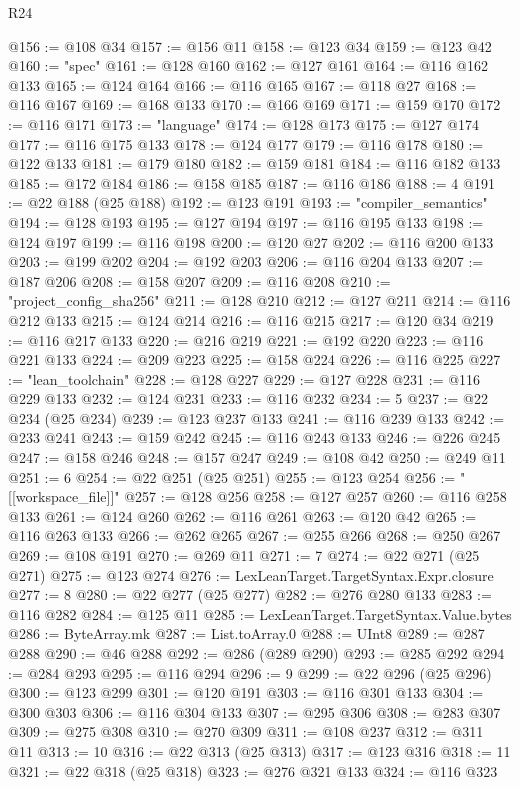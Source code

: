\begin{lexlean}{R24}
\begin{coremodule}
@156 := @108 @34
@157 := @156 @11
@158 := @123 @34
@159 := @123 @42
@160 := "spec"
@161 := @128 @160
@162 := @127 @161
@164 := @116 @162 @133
@165 := @124 @164
@166 := @116 @165
@167 := @118 @27
@168 := @116 @167
@169 := @168 @133
@170 := @166 @169
@171 := @159 @170
@172 := @116 @171
@173 := "language"
@174 := @128 @173
@175 := @127 @174
@177 := @116 @175 @133
@178 := @124 @177
@179 := @116 @178
@180 := @122 @133
@181 := @179 @180
@182 := @159 @181
@184 := @116 @182 @133
@185 := @172 @184
@186 := @158 @185
@187 := @116 @186
@188 := 4
@191 := @22 @188 (@25 @188)
@192 := @123 @191
@193 := "compiler_semantics"
@194 := @128 @193
@195 := @127 @194
@197 := @116 @195 @133
@198 := @124 @197
@199 := @116 @198
@200 := @120 @27
@202 := @116 @200 @133
@203 := @199 @202
@204 := @192 @203
@206 := @116 @204 @133
@207 := @187 @206
@208 := @158 @207
@209 := @116 @208
@210 := "project_config_sha256"
@211 := @128 @210
@212 := @127 @211
@214 := @116 @212 @133
@215 := @124 @214
@216 := @116 @215
@217 := @120 @34
@219 := @116 @217 @133
@220 := @216 @219
@221 := @192 @220
@223 := @116 @221 @133
@224 := @209 @223
@225 := @158 @224
@226 := @116 @225
@227 := "lean_toolchain"
@228 := @128 @227
@229 := @127 @228
@231 := @116 @229 @133
@232 := @124 @231
@233 := @116 @232
@234 := 5
@237 := @22 @234 (@25 @234)
@239 := @123 @237 @133
@241 := @116 @239 @133
@242 := @233 @241
@243 := @159 @242
@245 := @116 @243 @133
@246 := @226 @245
@247 := @158 @246
@248 := @157 @247
@249 := @108 @42
@250 := @249 @11
@251 := 6
@254 := @22 @251 (@25 @251)
@255 := @123 @254
@256 := "[[workspace_file]]"
@257 := @128 @256
@258 := @127 @257
@260 := @116 @258 @133
@261 := @124 @260
@262 := @116 @261
@263 := @120 @42
@265 := @116 @263 @133
@266 := @262 @265
@267 := @255 @266
@268 := @250 @267
@269 := @108 @191
@270 := @269 @11
@271 := 7
@274 := @22 @271 (@25 @271)
@275 := @123 @274
@276 := LexLeanTarget.TargetSyntax.Expr.closure
@277 := 8
@280 := @22 @277 (@25 @277)
@282 := @276 @280 @133
@283 := @116 @282
@284 := @125 @11
@285 := LexLeanTarget.TargetSyntax.Value.bytes
@286 := ByteArray.mk
@287 := List.toArray.{0}
@288 := UInt8
@289 := @287 @288
@290 := @46 @288
@292 := @286 (@289 @290)
@293 := @285 @292
@294 := @284 @293
@295 := @116 @294
@296 := 9
@299 := @22 @296 (@25 @296)
@300 := @123 @299
@301 := @120 @191
@303 := @116 @301 @133
@304 := @300 @303
@306 := @116 @304 @133
@307 := @295 @306
@308 := @283 @307
@309 := @275 @308
@310 := @270 @309
@311 := @108 @237
@312 := @311 @11
@313 := 10
@316 := @22 @313 (@25 @313)
@317 := @123 @316
@318 := 11
@321 := @22 @318 (@25 @318)
@323 := @276 @321 @133
@324 := @116 @323

\end{coremodule}
\end{lexlean}
